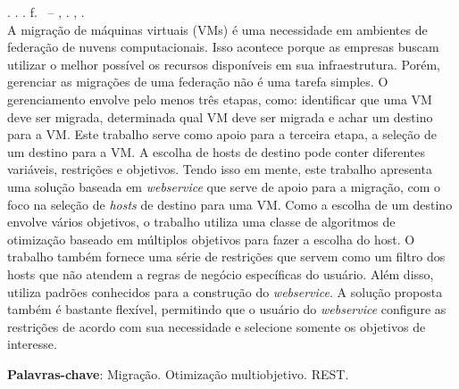 \begin{resumo}[RESUMO]
\begin{SingleSpacing}

\imprimirautorcitacao. \imprimirtitulo. \imprimirdata. \pageref {LastPage} f. \imprimirprojeto\ – \imprimirprograma, \imprimirinstituicao. \imprimirlocal, \imprimirdata.\\

A migração de máquinas virtuais (VMs) é uma necessidade em ambientes 
de federação de nuvens computacionais. Isso acontece porque as empresas
buscam utilizar o melhor possível os recursos disponíveis em sua infraestrutura.
Porém, gerenciar as migrações de uma federação não é uma tarefa simples. O gerenciamento
envolve pelo menos três etapas, como: identificar que uma VM deve ser migrada, determinada
qual VM deve ser migrada e achar um destino para a VM. Este trabalho serve como apoio 
para a terceira etapa, a seleção de um destino para a VM. A escolha de hosts de destino pode conter
diferentes variáveis, restrições e objetivos. Tendo isso em mente, este trabalho apresenta uma solução
baseada em \textit{webservice} que serve de apoio para a migração, com o foco na seleção 
de \textit{hosts} de destino para uma VM. Como a escolha de um destino envolve 
vários objetivos, o trabalho utiliza uma classe de algoritmos de otimização baseado em 
múltiplos objetivos para fazer a escolha do host. O trabalho também fornece uma série de restrições
que servem como um filtro dos hosts que não atendem a regras de negócio específicas do usuário.
Além disso, utiliza padrões conhecidos para a construção do \textit{webservice}.  
A solução proposta também é bastante flexível, permitindo que o 
usuário do \textit{webservice} configure as restrições de acordo com sua necessidade e 
selecione somente os objetivos de interesse.

\textbf{Palavras-chave}: Migração. Otimização multiobjetivo. REST.

\end{SingleSpacing}
\end{resumo}
